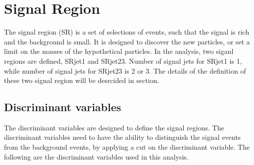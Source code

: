 \chapter{Signal Region}
\label{ch:SR}

The signal region (SR) is a set of selections of events, such that the signal is rich and the background is small.
It is designed to discover the new particles, or set a limit on the masses of the hypothetical particles.
In the analysis, two siganl regions are defined, SRjet1 and SRjet23.
Number of signal jets for SRjet1 is 1, while number of signal jets for SRjet23 is 2 or 3.
The details of the definition of these two signal region will be desrcided in section.

\section{Discriminant variables}
The discriminant variables are designed to define the signal regions.
The discriminant variables need to have the ability to distinguish the signal events from the background events, by applying a cut on the discriminant variable.
The following are the discriminant variables used in this analysis.
